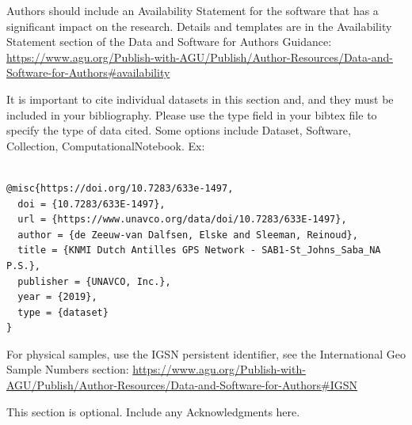 \documentclass[draft]{agujournal2019}
\begin{document}
Authors should include an Availability Statement for the software that has a significant impact on the research. Details and templates are in the Availability Statement section of the Data and Software for Authors Guidance: \url{https://www.agu.org/Publish-with-AGU/Publish/Author-Resources/Data-and-Software-for-Authors#availability}

It is important to cite individual datasets in this section and, and they must be included in your bibliography. Please use the type field in your bibtex file to specify the type of data cited. Some options include Dataset, Software, Collection, ComputationalNotebook. Ex: 
\\
\begin{verbatim}

@misc{https://doi.org/10.7283/633e-1497,
  doi = {10.7283/633E-1497},
  url = {https://www.unavco.org/data/doi/10.7283/633E-1497},
  author = {de Zeeuw-van Dalfsen, Elske and Sleeman, Reinoud},
  title = {KNMI Dutch Antilles GPS Network - SAB1-St_Johns_Saba_NA P.S.},
  publisher = {UNAVCO, Inc.},
  year = {2019},
  type = {dataset}
}

\end{verbatim}

For physical samples, use the IGSN persistent identifier, see the International Geo Sample Numbers section:
\url{https://www.agu.org/Publish-with-AGU/Publish/Author-Resources/Data-and-Software-for-Authors#IGSN}

\acknowledgments
This section is optional. Include any Acknowledgments here.




%
%


\end{document}
